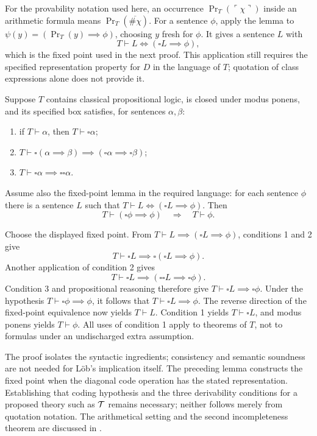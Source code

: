 For the provability notation used here, an occurrence
$\operatorname{Pr}_T(\ulcorner\chi\urcorner)$ inside an arithmetic
formula means $\operatorname{Pr}_T(\overline{\#\chi})$.
For a sentence $\phi$, apply the lemma to
$\psi(y)=(\operatorname{Pr}_T(y)\implies\phi)$, choosing $y$ fresh
for $\phi$. It gives a sentence $L$ with
\[
T\vdash L\iff(\square L\implies\phi),
\]
which is the fixed point used in the next proof. This application still
requires the specified representation property for $D$ in the language
of $T$; quotation of class expressions alone does not provide it.

\begin{theorem}
\label{thm:local_Lob}
Suppose $T$ contains classical propositional logic, is closed under modus
ponens, and its specified box satisfies, for sentences $\alpha,\beta$:
\begin{enumerate}
\item if $T\vdash\alpha$, then $T\vdash\square\alpha$;
\item $T\vdash\square(\alpha\implies\beta)\implies
(\square\alpha\implies\square\beta)$;
\item $T\vdash\square\alpha\implies\square\square\alpha$.
\end{enumerate}
Assume also the fixed-point lemma in the required language: for each
sentence $\phi$ there is a sentence $L$ such that
$T\vdash L\iff(\square L\implies\phi)$.
Then
\[
T\vdash(\square\phi\implies\phi)\quad\Longrightarrow\quad
T\vdash\phi.
\]
\end{theorem}
\Proof
Choose the displayed fixed point. From
$T\vdash L\implies(\square L\implies\phi)$, conditions 1 and 2 give
\[
T\vdash\square L\implies\square(\square L\implies\phi).
\]
Another application of condition 2 gives
\[
T\vdash\square L\implies
 (\square\square L\implies\square\phi).
\]
Condition 3 and propositional reasoning therefore give
$T\vdash\square L\implies\square\phi$. Under the hypothesis
$T\vdash\square\phi\implies\phi$, it follows that
$T\vdash\square L\implies\phi$. The reverse direction of the
fixed-point equivalence now yields $T\vdash L$. Condition 1 yields
$T\vdash\square L$, and modus ponens yields $T\vdash\phi$.
All uses of condition 1 apply to theorems of $T$, not to formulas under
an undischarged extra assumption.
\Done

The proof isolates the syntactic ingredients; consistency and semantic
soundness are not needed for L\"ob's implication itself. The preceding
lemma constructs the fixed point when the diagonal code operation has
the stated representation. Establishing that coding hypothesis and the
three derivability conditions for a proposed theory such as $\mathcal{T}$
remains necessary; neither follows merely from quotation notation.
The arithmetical setting and the second incompleteness theorem are discussed
in \cite[Section~2]{Beklemishev2010}.

